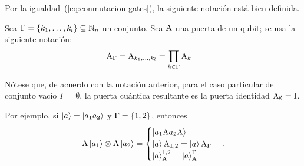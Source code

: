 Por la igualdad~(\ref{eq:conmutacion-gates}), la siguiente notación está bien definida.
\begin{notation}
	Sea $\Gamma=\{k_1,\dots,k_l\}\subseteq\mathbb{N}_n$ un conjunto.
	Sea $\text{A}$ una puerta de un qubit; se usa la siguiente notación:
	\begin{align}
		\text{A}_{\Gamma} &= \text{A}_{k_1,\dots,k_l}=\prod_{k\in\Gamma}\text{A}_k
	\end{align}
\end{notation}

Nótese que, de acuerdo con la notación anterior, para el caso particular del conjunto vacío $\Gamma=\emptyset$, la puerta cuántica resultante es la puerta identidad $\text{A}_\emptyset=\text{I}$.

Por ejemplo, si $\ket{a}=\ket{a_1 a_2}$ y $\Gamma = \{1,2\}$, entonces
\[
	\text{A}\ket{a_1}\otimes \text{A}\ket{a_2} =
	\begin{cases}
		\ket{a_1\text{A}a_2\text{A}}\\
		\ket{a}\text{A}_{1,2}=\ket{a}\text{A}_{\Gamma}\\
		\ket{a}^{1,2}_{\text{A}}=\ket{a}^{\Gamma}_{\text{A}}
	\end{cases}.
\]
